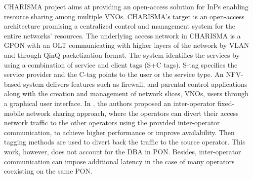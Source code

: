 CHARISMA project \cite{7561040} aims at providing an open-access solution for \acp{InP} enabling resource sharing among multiple \acp{VNO}. CHARISMA's target is an open-access architecture promising a centralized control and management system for the entire networks' resources. The underlying access network in CHARISMA is a \ac{GPON} with an \ac{OLT} communicating with higher layers of the network by \ac{VLAN} and through QinQ packetization format. The system identifies the services by using a combination of service and client tags (S+C tags). S-tag specifies the service provider and the C-tag points to the user or the service type. An \ac{NFV}-based system delivers features such as firewall, and parental control applications along with the creation and management of network slices, \acp{VNO}, users through a graphical user interface.
In \cite{7958548}, the authors proposed an inter-operator fixed-mobile network sharing approach, where the operators can divert their access network traffic to the other operators using the provided inter-operator communication, to achieve higher performance or improve availability. Then tagging methods are used to divert back the traffic to the source operator. This work, however, does not account for the \ac{DBA} in \ac{PON}. Besides, inter-operator communication can impose additional latency in the case of many operators coexisting on the same \ac{PON}.















